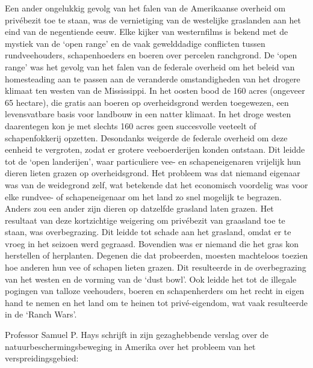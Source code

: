 \documentclass[
  a5paper,
  smalldemyvopaper,10pt,twoside,onecolumn,openright,extrafontsizes,hidelinks]{memoir}
\begin{document}
Een ander ongelukkig gevolg van het falen van de Amerikaanse overheid om
privébezit toe te staan, was de vernietiging van de westelijke
graslanden aan het eind van de negentiende eeuw. Elke kijker van
westernfilms is bekend met de mystiek van de `open range' en de vaak
gewelddadige conflicten tussen rundveehouders, schapenhoeders en boeren
over percelen ranchgrond. De `open range' was het gevolg van het falen
van de federale overheid om het beleid van homesteading aan te passen
aan de veranderde omstandigheden van het drogere klimaat ten westen van
de Mississippi. In het oosten bood de 160 acres (ongeveer 65 hectare),
die gratis aan boeren op overheidsgrond werden toegewezen, een
levensvatbare basis voor landbouw in een natter klimaat. In het droge
westen daarentegen kon je met slechts 160 acres geen succesvolle
veeteelt of schapenfokkerij opzetten. Desondanks weigerde de federale
overheid om deze eenheid te vergroten, zodat er grotere veeboerderijen
konden ontstaan. Dit leidde tot de `open landerijen', waar particuliere
vee- en schapeneigenaren vrijelijk hun dieren lieten grazen op
overheidsgrond. Het probleem was dat niemand eigenaar was van de
weidegrond zelf, wat betekende dat het economisch voordelig was voor
elke rundvee- of schapeneigenaar om het land zo snel mogelijk te
begrazen. Anders zou een ander zijn dieren op datzelfde grasland laten
grazen. Het resultaat van deze kortzichtige weigering om privébezit van
graasland toe te staan, was overbegrazing. Dit leidde tot schade aan het
grasland, omdat er te vroeg in het seizoen werd gegraasd. Bovendien was
er niemand die het gras kon herstellen of herplanten. Degenen die dat
probeerden, moesten machteloos toezien hoe anderen hun vee of schapen
lieten grazen. Dit resulteerde in de overbegrazing van het westen en de
vorming van de `dust bowl'. Ook leidde het tot de illegale pogingen van
talloze veehouders, boeren en schapenherders om het recht in eigen hand
te nemen en het land om te heinen tot privé-eigendom, wat vaak
resulteerde in de `Ranch Wars'.

Professor Samuel P. Hays schrijft in zijn gezaghebbende verslag over de
natuurbeschermingsbeweging in Amerika over het probleem van het
verspreidingsgebied:
\end{document}
